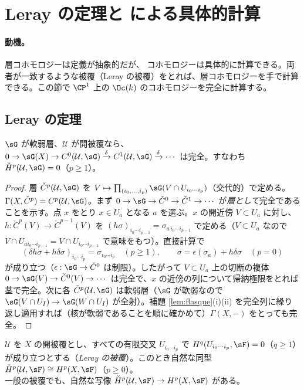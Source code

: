 \section{Leray の定理と \Cech{} による具体的計算}\label{sec:leray}

\paragraph{動機。}層コホモロジーは定義が抽象的だが、\Cech{} コホモロジーは具体的に計算できる。両者が一致するような被覆（Leray の被覆）をとれば、層コホモロジーを手で計算できる。この節で $\CP^1$ 上の $\Oc(k)$ のコホモロジーを完全に計算する。

\subsection{Leray の定理}
\begin{lem}\label{lem:flasqueCech}\tP
$\sG$ が軟弱層、$\mathcal U$ が開被覆なら、$0\to\sG(X)\to C^0(\mathcal U,\sG)\xrightarrow{\delta}C^1(\mathcal U,\sG)\xrightarrow{\delta}\cdots$ は完全。すなわち $\check H^p(\mathcal U,\sG)=0$（$p\ge1$）。
\end{lem}
\begin{proof}
層 $\check C^p(\mathcal U,\sG)$ を $V\mapsto\prod_{(i_0,\dots,i_p)}\sG(V\cap U_{i_0\cdots i_p})$（交代的）で定める。$\Gamma(X,\check C^p)=C^p(\mathcal U,\sG)$。まず $0\to\sG\to\check C^0\to\check C^1\to\cdots$ が\emph{層として}完全であることを示す。点 $x$ をとり $x\in U_a$ となる $a$ を選ぶ。$x$ の開近傍 $V\subset U_a$ に対し、$h:\check C^p(V)\to\check C^{p-1}(V)$ を $(h\sigma)_{i_0\cdots i_{p-1}}=\sigma_{a\,i_0\cdots i_{p-1}}$ で定める（$V\subset U_a$ なので $V\cap U_{ai_0\cdots i_{p-1}}=V\cap U_{i_0\cdots i_{p-1}}$ で意味をもつ）。直接計算で
\[
(\delta h\sigma+h\delta\sigma)_{i_0\cdots i_p}=\sigma_{i_0\cdots i_p}\quad(p\ge1),\qquad\sigma=\epsilon(\sigma_a)+h\delta\sigma\quad(p=0)
\]
が成り立つ（$\epsilon:\sG\to\check C^0$ は制限）。したがって $V\subset U_a$ 上の切断の複体 $0\to\sG(V)\to\check C^0(V)\to\cdots$ は完全で、$x$ の近傍の列について帰納極限をとれば茎で完全。次に各 $\check C^p(\mathcal U,\sG)$ は軟弱層（$\sG$ が軟弱なので $\sG(V\cap U_I)\to\sG(W\cap U_I)$ が全射）。補題 \ref{lem:flasque}(i)(ii) を完全列に繰り返し適用すれば（核が軟弱であることを順に確かめて）$\Gamma(X,-)$ をとっても完全。\qedhere
\end{proof}
\begin{thm}[Leray]\label{thm:leray}\tP
$\mathcal U$ を $X$ の開被覆とし、すべての有限交叉 $U_{i_0\cdots i_p}$ で $H^q(U_{i_0\cdots i_p},\sF)=0$（$q\ge1$）が成り立つとする（\emph{Leray の被覆}）。このとき自然な同型 $\check H^p(\mathcal U,\sF)\cong H^p(X,\sF)$（$p\ge0$）。\\
一般の被覆でも、自然な写像 $\check H^p(\mathcal U,\sF)\to H^p(X,\sF)$ がある。
\end{thm}

